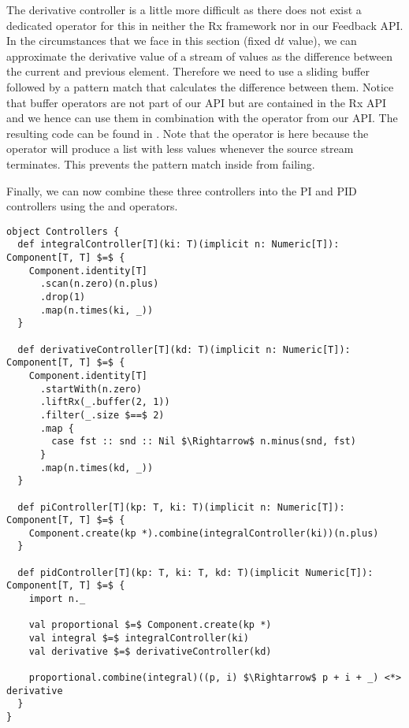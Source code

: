 The derivative controller is a little more difficult as there does not exist a dedicated operator for this in neither the Rx framework nor in our Feedback API. In the circumstances that we face in this section (fixed $\mathrm{d} t$ value), we can approximate the derivative value of a stream of values as the difference between the current and previous element. Therefore we need to use a sliding buffer followed by a pattern match that calculates the difference between them. Notice that buffer operators are not part of our API but are contained in the Rx API and we hence can use them in combination with the  operator from our API. The resulting code can be found in . Note that the  operator is here because the  operator will produce a list with less values whenever the source stream terminates. This prevents the pattern match inside  from failing.

Finally, we can now combine these three controllers into the PI and PID controllers using the  and \code{<*>} operators.

\begin{minipage}{\linewidth}
\begin{lstlisting}[style=ScalaStyle, caption={Implementation of the various commonly used controllers}, label={lst:controller-implementations}]
object Controllers {
  def integralController[T](ki: T)(implicit n: Numeric[T]): Component[T, T] $=$ {
    Component.identity[T]
      .scan(n.zero)(n.plus)
      .drop(1)
      .map(n.times(ki, _))
  }

  def derivativeController[T](kd: T)(implicit n: Numeric[T]): Component[T, T] $=$ {
    Component.identity[T]
      .startWith(n.zero)
      .liftRx(_.buffer(2, 1))
      .filter(_.size $==$ 2)
      .map {
        case fst :: snd :: Nil $\Rightarrow$ n.minus(snd, fst)
      }
      .map(n.times(kd, _))
  }
  
  def piController[T](kp: T, ki: T)(implicit n: Numeric[T]): Component[T, T] $=$ {
    Component.create(kp *).combine(integralController(ki))(n.plus)
  }
  
  def pidController[T](kp: T, ki: T, kd: T)(implicit Numeric[T]): Component[T, T] $=$ {
    import n._
    
    val proportional $=$ Component.create(kp *)
    val integral $=$ integralController(ki)
    val derivative $=$ derivativeController(kd)
    
    proportional.combine(integral)((p, i) $\Rightarrow$ p + i + _) <*> derivative
  }
}
\end{lstlisting}
\end{minipage}

